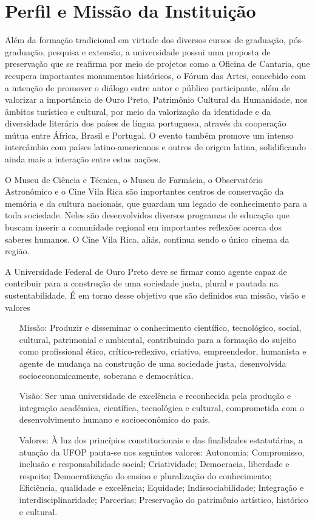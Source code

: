 \documentclass[
	12pt,				%
	openright,			%
	oneside,			%
	a4paper,			%
	english,			%
	brazil				%
	]{abntex2}
\begin{document}
\section{Perfil e Missão da Instituição}
%
Além da formação tradicional em virtude dos diversos cursos de graduação, pós-graduação, pesquisa e extensão, a universidade possui uma proposta de preservação que se reafirma por meio de  projetos como a Oficina de Cantaria, que recupera importantes monumentos históricos, o Fórum das Artes, concebido com a intenção de promover o diálogo entre autor e público participante, além de valorizar a importância de Ouro Preto, Patrimônio Cultural da Humanidade, nos âmbitos turístico e cultural, por meio da valorização da identidade e da diversidade literária dos países de língua portuguesa, através da cooperação mútua entre África, Brasil e Portugal. O evento também promove um intenso intercâmbio com países latino-americanos e outros de origem latina, solidificando ainda mais a interação entre estas nações.

O Museu de Ciência e Técnica, o Museu de Farmácia, o Observatório Astronômico e o Cine Vila Rica são importantes centros de conservação da memória e da cultura nacionais, que guardam um legado de conhecimento para a toda sociedade. Neles são desenvolvidos diversos programas de educação que buscam inserir a comunidade regional em importantes reflexões acerca dos saberes humanos. O Cine Vila Rica, aliás, continua sendo o único cinema da região.

A Universidade Federal de Ouro Preto deve se firmar como agente capaz de contribuir para a construção de uma sociedade justa, plural e pautada na sustentabilidade. É em torno desse objetivo que são definidos sua missão, visão e valores
\begin{itemize}
	\item [Missão:] Produzir e disseminar o conhecimento científico, tecnológico, social, cultural, patrimonial e ambiental, contribuindo para a formação do sujeito como profissional ético, crítico-reflexivo, criativo, empreendedor, humanista e agente de mudança na construção de uma sociedade justa, desenvolvida socioeconomicamente, soberana e democrática.
	\item [Visão:] Ser uma universidade de excelência e reconhecida pela produção e integração acadêmica, científica, tecnológica e cultural, comprometida com o desenvolvimento humano e socioeconômico do país.
	\item [Valores:] À luz dos princípios constitucionais e das finalidades estatutárias, a atuação da UFOP pauta-se nos seguintes valores:
	\subitem Autonomia;
	\subitem Compromisso, inclusão e responsabilidade social;
	\subitem Criatividade;
	\subitem Democracia, liberdade e respeito;
	\subitem Democratização do ensino e pluralização do conhecimento;
	\subitem Eficiência, qualidade e excelência;
	\subitem Equidade;
	\subitem Indissociabilidade;
	\subitem Integração e interdisciplinaridade;
	\subitem Parcerias;
	\subitem Preservação do patrimônio artístico, histórico e cultural.
\end{itemize}
\end{document}
